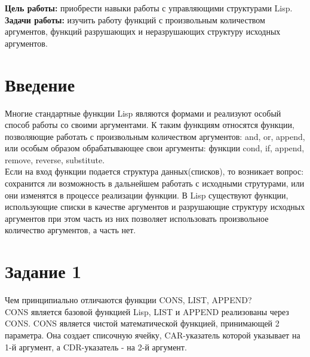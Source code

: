\documentclass[a4paper, 12pt]{article}
\begin{document}
\tableofcontents
\clearpage
\newpage

\textbf{Цель работы:} приобрести навыки работы с управляющими структурами Lisp.
\\ \hspace*{5mm} \textbf{Задачи работы:} изучить работу функций с произвольным количеством аргументов, функций разрушающих и неразрушающих структуру исходных аргументов.


\section*{Введение}

\hspace*{5mm} Многие стандартные функции Lisp являются формами и реализуют особый способ работы со своими аргументами. К таким функциям относятся функции, позволяющие работать с произвольным количеством аргументов: and, or, append, или особым образом обрабатывающее свои аргументы: функции cond, if, append, remove, reverse, substitute.
\\ \hspace*{5mm} Если на вход функции подается структура данных(списков), то возникает вопрос: сохранится ли возможность в дальнейшем работать с исходными струтурами, или они изменятся в процессе реализации функции. В Lisp существуют функции, использующие списки в качестве аргументов и разрушающие структуру исходных аргументов при этом часть из них позволяет использовать произвольное количество аргументов, а часть нет.
\clearpage
\newpage




\lstset{style=mystyle}

\section*{Задание 1}
Чем принципиально отличаются функции CONS, LIST, APPEND?\\
CONS является базовой функцией Lisp, LIST и APPEND реализованы через CONS. CONS является чистой математической функцией, принимающей 2 параметра. Она создает списочную ячейку, CAR-указатель которой указывает на 1-й аргумент, а CDR-указатель - на 2-й аргумент.
\end{document}
